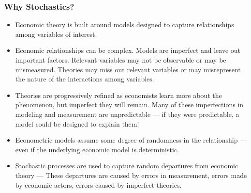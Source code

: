 

\begin{frame}
\frametitle{Why Stochastics?}
\begin{itemize}
\item Economic theory is built around models designed to capture relationships among variables of interest.
\item Economic relationships can be complex. Models are imperfect and leave out important factors. Relevant variables may not be observable or may be mismeasured. Theories may miss out relevant variables or may misrepresent the nature of the interactions among variables. 
\item Theories are progressively refined as economists learn more about the phenomenon, but imperfect they will remain. Many of these imperfections in modeling and measurement are unpredictable --- if they were predictable, a model could be designed to explain them!
\item Econometric models assume some degree of randomness in the relationship --- even if the underlying economic model is deterministic. 
\item Stochastic processes are used to capture random departures from economic theory --- These departures are caused by errors in measurement, errors made by economic actors, errors caused by imperfect theories.
\end{itemize}
\end{frame}
